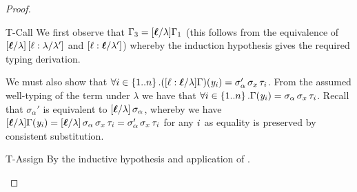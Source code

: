 \begin{proof}
\begin{enumerate}
\begin{rneqncase}{T-Call}
      We first observe that $\Gamma_{{\mathrm{3}}}  \ottsym{=}  \ottsym{[}  \oldvec{\ell}  \ottsym{/}  \lambda  \ottsym{]}  \Gamma_{{\mathrm{1}}}$ (this follows from the
      equivalence of $\ottsym{[}  \oldvec{\ell}  \ottsym{/}  \lambda  \ottsym{]} \, \ottsym{[}  \ell  \ottsym{:}  \lambda  \ottsym{/}  \lambda'  \ottsym{]}$ and
      $\ottsym{[}  \ell  \ottsym{:}  \oldvec{\ell}  \ottsym{/}  \lambda'  \ottsym{]}$) whereby the induction hypothesis
      gives the required typing derivation.

      We must also show that
      $\forall i \in \set{1..n}.\ottsym{(}  \ottsym{[}  \ell  \ottsym{:}  \oldvec{\ell}  \ottsym{/}  \lambda  \ottsym{]}  \Gamma  \ottsym{)}  \ottsym{(}  \mathit{y_{\ottmv{i}}}  \ottsym{)}  \ottsym{=}  \sigma_{\alpha}' \, \sigma_{x} \, \tau_{\ottmv{i}}$.
      From the assumed well-typing of the term under $\lambda$ we have
      that $\forall i \in\left\{{1..n}\right\}.\Gamma  (  \mathit{y_{\mathit{i}}}  )  =  \sigma_{\alpha} \, \sigma_{x} \, \tau_{\mathit{i}}$. Recall
      that $\sigma_{\alpha}'$ is equivalent to $\ottsym{[}  \oldvec{\ell}  \ottsym{/}  \lambda  \ottsym{]} \, \sigma_{\alpha}$, whereby we have
      $\ottsym{[}  \oldvec{\ell}  \ottsym{/}  \lambda  \ottsym{]}  \Gamma  \ottsym{(}  \mathit{y_{\ottmv{i}}}  \ottsym{)}  \ottsym{=}  \ottsym{[}  \oldvec{\ell}  \ottsym{/}  \lambda  \ottsym{]} \, \sigma_{\alpha} \, \sigma_{x} \, \tau_{\ottmv{i}}  \ottsym{=}  \sigma_{\alpha}' \, \sigma_{x} \, \tau_{\ottmv{i}}$ for any $\mathit{i}$ as
      equality is preserved by consistent substitution.
    \end{rneqncase}

    \begin{rncase}{T-Assign}
      By the inductive hypothesis and application of .
    \end{rncase}


\end{enumerate}
\end{proof}
